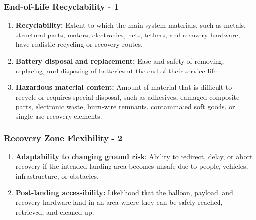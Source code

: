 \subsubsection*{End-of-Life Recyclability - 1}
\begin{enumerate}
    \item \textbf{Recyclability:} Extent to which the main system materials, such as metals, structural parts, motors, electronics, nets, tethers, and recovery hardware, have realistic recycling or recovery routes.

    \item \textbf{Battery disposal and replacement:} Ease and safety of removing, replacing, and disposing of batteries at the end of their service life.

    \item \textbf{Hazardous material content:} Amount of material that is difficult to recycle or requires special disposal, such as adhesives, damaged composite parts, electronic waste, burn-wire remnants, contaminated soft goods, or single-use recovery elements.
\end{enumerate}

\subsubsection*{Recovery Zone Flexibility - 2}
\begin{enumerate}


    \item \textbf{Adaptability to changing ground risk:} Ability to redirect, delay, or abort recovery if the intended landing area becomes unsafe due to people, vehicles, infrastructure, or obstacles.
    \item \textbf{Post-landing accessibility:} Likelihood that the balloon, payload, and recovery hardware land in an area where they can be safely reached, retrieved, and cleaned up.
\end{enumerate}


